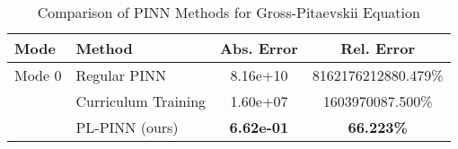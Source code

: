 \begin{table}[htbp]
\centering
\caption{Comparison of PINN Methods for Gross-Pitaevskii Equation}
\label{tab:pinn_comparison}
\begin{tabular}{llcc}
\toprule
Mode & Method & Abs. Error & Rel. Error \\
\midrule
Mode 0 & Regular PINN & 8.16e+10 & 8162176212880.479\% \\
 & Curriculum Training & 1.60e+07 & 1603970087.500\% \\
 & PL-PINN (ours) & \textbf{6.62e-01} & \textbf{66.223\%} \\
\bottomrule
\end{tabular}
\end{table}